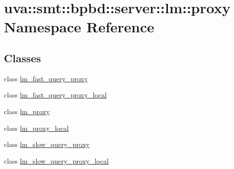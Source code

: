 \hypertarget{namespaceuva_1_1smt_1_1bpbd_1_1server_1_1lm_1_1proxy}{}\section{uva\+:\+:smt\+:\+:bpbd\+:\+:server\+:\+:lm\+:\+:proxy Namespace Reference}
\label{namespaceuva_1_1smt_1_1bpbd_1_1server_1_1lm_1_1proxy}
\subsection*{Classes}
\begin{DoxyCompactItemize}
\item 
class \hyperlink{classuva_1_1smt_1_1bpbd_1_1server_1_1lm_1_1proxy_1_1lm__fast__query__proxy}{lm\+\_\+fast\+\_\+query\+\_\+proxy}
\item 
class \hyperlink{classuva_1_1smt_1_1bpbd_1_1server_1_1lm_1_1proxy_1_1lm__fast__query__proxy__local}{lm\+\_\+fast\+\_\+query\+\_\+proxy\+\_\+local}
\item 
class \hyperlink{classuva_1_1smt_1_1bpbd_1_1server_1_1lm_1_1proxy_1_1lm__proxy}{lm\+\_\+proxy}
\item 
class \hyperlink{classuva_1_1smt_1_1bpbd_1_1server_1_1lm_1_1proxy_1_1lm__proxy__local}{lm\+\_\+proxy\+\_\+local}
\item 
class \hyperlink{classuva_1_1smt_1_1bpbd_1_1server_1_1lm_1_1proxy_1_1lm__slow__query__proxy}{lm\+\_\+slow\+\_\+query\+\_\+proxy}
\item 
class \hyperlink{classuva_1_1smt_1_1bpbd_1_1server_1_1lm_1_1proxy_1_1lm__slow__query__proxy__local}{lm\+\_\+slow\+\_\+query\+\_\+proxy\+\_\+local}
\end{DoxyCompactItemize}
